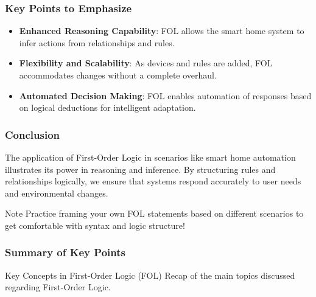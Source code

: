 \documentclass[aspectratio=169]{beamer}
\begin{document}
\begin{frame}[fragile]
    \frametitle{Key Points to Emphasize}
    \begin{itemize}
        \item \textbf{Enhanced Reasoning Capability}: FOL allows the smart home system to infer actions from relationships and rules.
        \item \textbf{Flexibility and Scalability}: As devices and rules are added, FOL accommodates changes without a complete overhaul.
        \item \textbf{Automated Decision Making}: FOL enables automation of responses based on logical deductions for intelligent adaptation.
    \end{itemize}
\end{frame}

\begin{frame}[fragile]
    \frametitle{Conclusion}
    The application of First-Order Logic in scenarios like smart home automation illustrates its power in reasoning and inference. 
    By structuring rules and relationships logically, we ensure that systems respond accurately to user needs and environmental changes.
    
    \begin{block}{Note}
        Practice framing your own FOL statements based on different scenarios to get comfortable with syntax and logic structure!
    \end{block}
\end{frame}

\begin{frame}[fragile]
    \frametitle{Summary of Key Points}
    \begin{block}{Key Concepts in First-Order Logic (FOL)}
        Recap of the main topics discussed regarding First-Order Logic.
    \end{block}
\end{frame}
\end{document}
